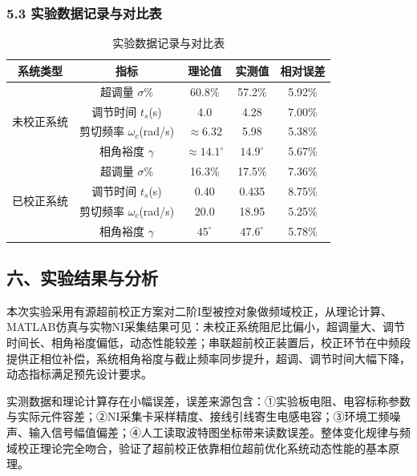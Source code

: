 \documentclass[12pt,a4paper,UTF8]{ctexart}
\begin{document}
\subsubsection{5.3 实验数据记录与对比表}
\begin{table}[h]
\centering
{}
\renewcommand{\arraystretch}{1.5}
\caption{实验数据记录与对比表}
\begin{tabular}{|c|c|c|c|c|}
\hline
\textbf{系统类型} & \textbf{指标} & \textbf{理论值} & \textbf{实测值} & \textbf{相对误差} \\
\hline
\multirow{4}{*}{未校正系统}
& 超调量 $\sigma\%$ & 60.8\% & 57.2\% & 5.92\% \\
\cline{2-5}
& 调节时间 $t_s$(s) & 4.0 & 4.28 & 7.00\% \\
\cline{2-5}
& 剪切频率 $\omega_c$(rad/s) & $\approx6.32$ & 5.98 & 5.38\% \\
\cline{2-5}
& 相角裕度 $\gamma$ & $\approx14.1^\circ$ & $14.9^\circ$ & 5.67\% \\
\hline
\multirow{4}{*}{已校正系统}
& 超调量 $\sigma\%$ & 16.3\% & 17.5\% & 7.36\% \\
\cline{2-5}
& 调节时间 $t_s$(s) & 0.40 & 0.435 & 8.75\% \\
\cline{2-5}
& 剪切频率 $\omega_c$(rad/s) & 20.0 & 18.95 & 5.25\% \\
\cline{2-5}
& 相角裕度 $\gamma$ & $45^\circ$ & $47.6^\circ$ & 5.78\% \\
\hline
\end{tabular}
\end{table}

\subsection{六、实验结果与分析}
本次实验采用有源超前校正方案对二阶I型被控对象做频域校正，从理论计算、MATLAB仿真与实物NI采集结果可见：未校正系统阻尼比偏小，超调量大、调节时间长、相角裕度偏低，动态性能较差；串联超前校正装置后，校正环节在中频段提供正相位补偿，系统相角裕度与截止频率同步提升，超调、调节时间大幅下降，动态指标满足预先设计要求。

实测数据和理论计算存在小幅误差，误差来源包含：①实验板电阻、电容标称参数与实际元件容差；②NI采集卡采样精度、接线引线寄生电感电容；③环境工频噪声、输入信号幅值偏差；④人工读取波特图坐标带来读数误差。整体变化规律与频域校正理论完全吻合，验证了超前校正依靠相位超前优化系统动态性能的基本原理。
\end{document}
